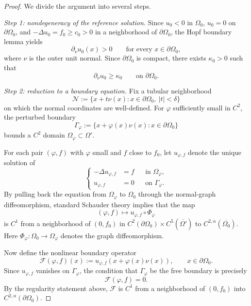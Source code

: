 \documentclass[a4paper,11pt,reqno]{amsart}
\numberwithin{equation}{section}
\theoremstyle{plain} %
\theoremstyle{definition} %
\theoremstyle{remark}
\begin{document}
\begin{proof}
We divide the argument into several steps.

\medskip
\noindent\emph{Step 1: nondegeneracy of the reference solution.}
Since \(u_0<0\) in \(\Omega_0\), \(u_0=0\) on \(\partial\Omega_0\), and
\(-\Delta u_0=f_0\ge c_0>0\) in a neighborhood of \(\partial\Omega_0\), the Hopf
boundary lemma yields
\[
\partial_\nu u_0(x)>0
\qquad \text{for every }x\in \partial\Omega_0,
\]
where \(\nu\) is the outer unit normal. Since \(\partial\Omega_0\) is compact,
there exists \(\kappa_0>0\) such that
\begin{equation}\label{eq:appendix-hopf-lower-bound}
\partial_\nu u_0\ge \kappa_0
\qquad\text{on }\partial\Omega_0.
\end{equation}

\medskip
\noindent\emph{Step 2: reduction to a boundary equation.}
Fix a tubular neighborhood
\[
\mathcal N:=\{x+t\nu(x):x\in \partial\Omega_0,\ |t|<\delta\}
\]
on which the normal coordinates are well-defined. For \(\varphi\) sufficiently
small in \(C^2\), the perturbed boundary
\[
\Gamma_\varphi:=\{x+\varphi(x)\nu(x):x\in \partial\Omega_0\}
\]
bounds a \(C^2\) domain \(\Omega_\varphi\subset \Omega'\).

For each pair \((\varphi,f)\) with \(\varphi\) small and \(f\) close to \(f_0\),
let \(u_{\varphi,f}\) denote the unique solution of
\[
\left\{
\begin{aligned}
-\Delta u_{\varphi,f} &= f &&\text{in }\Omega_\varphi,\\
u_{\varphi,f}&=0 &&\text{on }\Gamma_\varphi.
\end{aligned}
\right.
\]
By pulling back the equation from \(\Omega_\varphi\) to \(\Omega_0\) through the
normal-graph diffeomorphism, standard Schauder theory implies that the map
\[
(\varphi,f)\mapsto u_{\varphi,f}\circ \Phi_\varphi
\]
is \(C^1\) from a neighborhood of \((0,f_0)\) in
\(C^2(\partial\Omega_0)\times C^5(\overline{\Omega'})\) to
\(C^{2,\alpha}(\overline{\Omega_0})\). Here \(\Phi_\varphi:\Omega_0\to \Omega_\varphi\)
denotes the graph diffeomorphism.

Now define the nonlinear boundary operator
\[
\mathcal F(\varphi,f)(x)
:=
u_{\varphi,f}(x+\varphi(x)\nu(x)),
\qquad x\in \partial\Omega_0.
\]
Since \(u_{\varphi,f}\) vanishes on \(\Gamma_\varphi\), the condition that
\(\Gamma_\varphi\) be the free boundary is precisely
\begin{equation}\label{eq:appendix-free-boundary-equation}
\mathcal F(\varphi,f)=0.
\end{equation}
By the regularity statement above, \(\mathcal F\) is \(C^1\) from a neighborhood
of \((0,f_0)\) into \(C^{2,\alpha}(\partial\Omega_0)\).


\end{proof}
\end{document}

